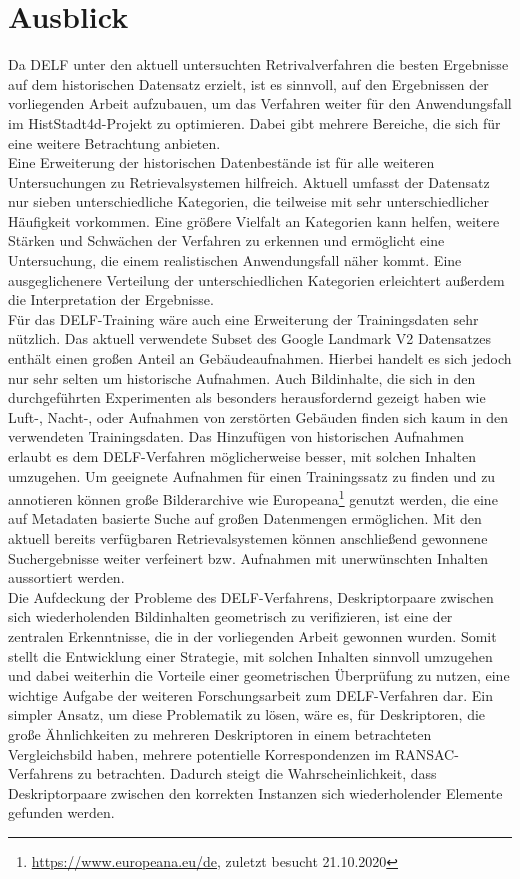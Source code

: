 \section{Ausblick}
Da DELF unter den aktuell untersuchten Retrivalverfahren die besten Ergebnisse auf dem historischen Datensatz erzielt, ist es sinnvoll, auf den Ergebnissen der vorliegenden Arbeit aufzubauen, um das Verfahren weiter für den Anwendungsfall im HistStadt4d-Projekt zu optimieren. Dabei gibt mehrere Bereiche, die sich für eine weitere Betrachtung anbieten.
\\
Eine Erweiterung der historischen Datenbestände ist für alle weiteren Untersuchungen zu Retrievalsystemen hilfreich. Aktuell umfasst der Datensatz nur sieben unterschiedliche Kategorien, die teilweise mit sehr unterschiedlicher Häufigkeit vorkommen. Eine größere Vielfalt an Kategorien kann helfen, weitere Stärken und Schwächen der Verfahren zu erkennen und ermöglicht eine Untersuchung, die einem realistischen Anwendungsfall näher kommt. Eine ausgeglichenere Verteilung der unterschiedlichen Kategorien erleichtert außerdem die Interpretation der Ergebnisse.
\\
Für das DELF-Training wäre auch eine Erweiterung der Trainingsdaten sehr nützlich. Das aktuell verwendete Subset des Google Landmark V2 Datensatzes enthält einen großen Anteil an Gebäudeaufnahmen. Hierbei handelt es sich jedoch nur sehr selten um historische Aufnahmen. Auch Bildinhalte, die sich in den durchgeführten Experimenten als besonders herausfordernd gezeigt haben wie Luft-, Nacht-, oder Aufnahmen von zerstörten Gebäuden finden sich kaum in den verwendeten Trainingsdaten. Das Hinzufügen von historischen Aufnahmen erlaubt es dem DELF-Verfahren möglicherweise besser, mit solchen Inhalten umzugehen. Um geeignete Aufnahmen für einen Trainingssatz zu finden und zu annotieren können große Bilderarchive wie Europeana\footnote{\url{https://www.europeana.eu/de}, zuletzt besucht 21.10.2020} genutzt werden, die eine auf Metadaten basierte Suche auf großen Datenmengen ermöglichen. Mit den aktuell bereits verfügbaren Retrievalsystemen können anschließend gewonnene Suchergebnisse weiter verfeinert bzw. Aufnahmen mit unerwünschten Inhalten aussortiert werden.
\\
Die Aufdeckung der Probleme des DELF-Verfahrens, Deskriptorpaare zwischen sich wiederholenden Bildinhalten geometrisch zu verifizieren, ist eine der zentralen Erkenntnisse, die in der vorliegenden Arbeit gewonnen wurden. Somit stellt die Entwicklung einer Strategie, mit solchen Inhalten sinnvoll umzugehen und dabei weiterhin die Vorteile einer geometrischen Überprüfung zu nutzen, eine wichtige Aufgabe der weiteren Forschungsarbeit zum DELF-Verfahren dar. Ein simpler Ansatz, um diese Problematik zu lösen, wäre es, für Deskriptoren, die große Ähnlichkeiten zu mehreren Deskriptoren in einem betrachteten Vergleichsbild haben, mehrere potentielle Korrespondenzen im RANSAC-Verfahrens zu betrachten. Dadurch steigt die Wahrscheinlichkeit, dass Deskriptorpaare zwischen den korrekten Instanzen sich wiederholender Elemente gefunden werden. 
